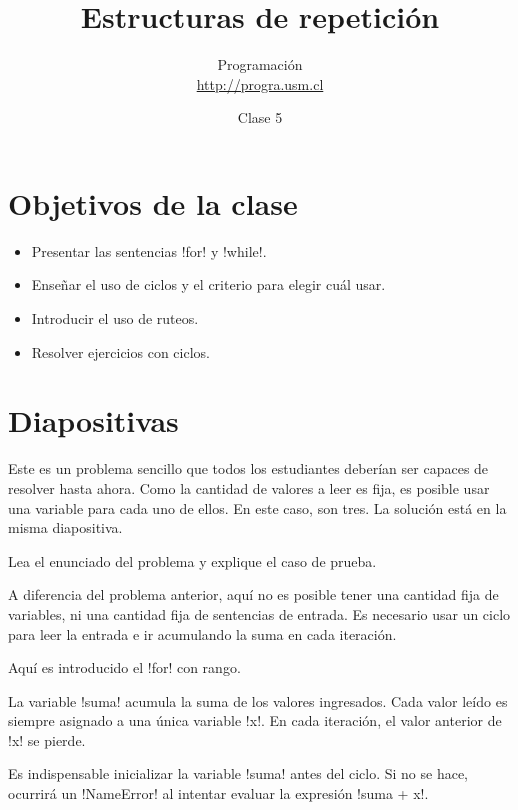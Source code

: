 \documentclass[10pt]{article}
\title{Estructuras de repetición}
\author{Programación \\ \url{http://progra.usm.cl}}
\date{Clase 5}
\begin{document}
  \maketitle

  \section*{Objetivos de la clase}
  \begin{itemize}
    \item Presentar las sentencias \li!for! y \li!while!.
    \item Enseñar el uso de ciclos y el criterio para elegir cuál usar.
    \item Introducir el uso de ruteos.
    \item Resolver ejercicios con ciclos.
  \end{itemize}

  \section*{Diapositivas}


  Este es un problema sencillo que todos los estudiantes
  deberían ser capaces de resolver hasta ahora.
  Como la cantidad de valores a leer es fija,
  es posible usar una variable para cada uno de ellos.
  En este caso, son tres.
  La solución está en la misma diapositiva.


  Lea el enunciado del problema y explique el caso de prueba.

  A diferencia del problema anterior,
  aquí no es posible tener una cantidad fija de variables,
  ni una cantidad fija de sentencias de entrada.
  Es necesario usar un ciclo
  para leer la entrada
  e ir acumulando la suma en cada iteración.


  Aquí es introducido el \li!for! con rango.

  La variable \li!suma! acumula la suma de los valores ingresados.
  Cada valor leído es siempre asignado a una única variable \li!x!.
  En cada iteración, el valor anterior de \li!x! se pierde.

  Es indispensable inicializar la variable \li!suma! antes del ciclo.
  Si no se hace, ocurrirá un \li!NameError!
  al intentar evaluar la expresión \li!suma + x!.
\end{document}
